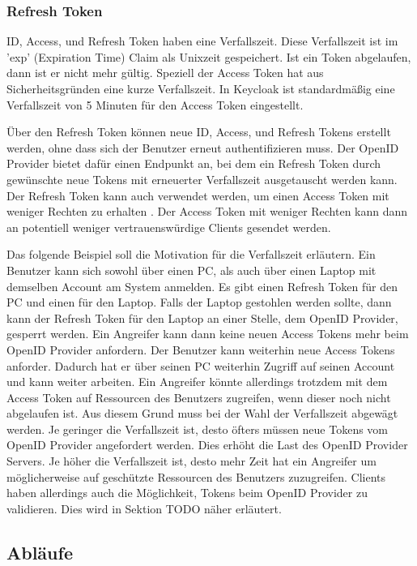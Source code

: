 \subsubsection{Refresh Token}

ID, Access, und Refresh Token haben eine Verfallszeit. Diese Verfallszeit ist im 'exp' (Expiration Time) Claim als Unixzeit gespeichert. Ist ein Token abgelaufen, dann ist er nicht mehr gültig. Speziell der Access Token hat aus Sicherheitsgründen eine kurze Verfallszeit. In Keycloak ist standardmäßig eine Verfallszeit von 5 Minuten für den Access Token eingestellt.

Über den Refresh Token können neue ID, Access, und Refresh Tokens erstellt werden, ohne dass sich der Benutzer erneut authentifizieren muss. Der OpenID Provider bietet dafür einen Endpunkt an, bei dem ein Refresh Token durch gewünschte neue Tokens mit erneuerter Verfallszeit ausgetauscht werden kann. Der Refresh Token kann auch verwendet werden, um einen Access Token mit weniger Rechten zu erhalten \cite{EB12}. Der Access Token mit weniger Rechten kann dann an potentiell weniger vertrauenswürdige Clients gesendet werden.

Das folgende Beispiel soll die Motivation für die Verfallszeit erläutern. Ein Benutzer kann sich sowohl über einen PC, als auch über einen Laptop mit demselben Account am System anmelden. Es gibt einen Refresh Token für den PC und einen für den Laptop. Falls der Laptop gestohlen werden sollte, dann kann der Refresh Token für den Laptop an einer Stelle, dem OpenID Provider, gesperrt werden. Ein Angreifer kann dann keine neuen Access Tokens mehr beim OpenID Provider anfordern. Der Benutzer kann weiterhin neue Access Tokens anforder. Dadurch hat er über seinen PC weiterhin Zugriff auf seinen Account und kann weiter arbeiten. Ein Angreifer könnte allerdings trotzdem mit dem Access Token auf Ressourcen des Benutzers zugreifen, wenn dieser noch nicht abgelaufen ist. Aus diesem Grund muss bei der Wahl der Verfallszeit abgewägt werden. Je geringer die Verfallszeit ist, desto öfters müssen neue Tokens vom OpenID Provider angefordert werden. Dies erhöht die Last des OpenID Provider Servers. Je höher die Verfallszeit ist, desto mehr Zeit hat ein Angreifer um möglicherweise auf geschützte Ressourcen des Benutzers zuzugreifen. Clients haben allerdings auch die Möglichkeit, Tokens beim OpenID Provider zu validieren. Dies wird in Sektion TODO näher erläutert.

\subsection{Abläufe} \label{EB_Abläufe}

